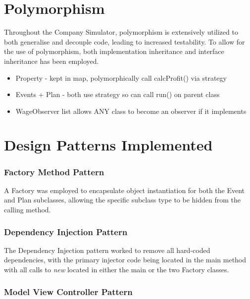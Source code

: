 \documentclass[]{article}
\begin{document}

\vspace*{0.8cm}
\section*{Polymorphism}

Throughout the Company Simulator, polymorphism is extensively utilized to both generalise and decouple code, leading to increased testability. To allow for the use of polymorphism, both implementation inheritance and interface inheritance has been employed. 

\begin{itemize}
	\item Property - kept in map, polymorphically call calcProfit() via strategy
	\item Events + Plan - both use strategy so can call run() on parent class
	\item WageObserver list allows ANY class to become an observer if it implements
\end{itemize}


\section*{Design Patterns Implemented}

\subsubsection*{Factory Method Pattern}

A Factory was employed to encapsulate object instantiation for both the Event and Plan subclasses, allowing the specific subclass type to be hidden from the calling method.

\subsubsection*{Dependency Injection Pattern}

The Dependency Injection pattern worked to remove all hard-coded dependencies, with the primary injector code being located in the main method with all calls to \textit{new} located in either the main or the two Factory classes.

\subsubsection*{Model View Controller Pattern}
\end{document}
